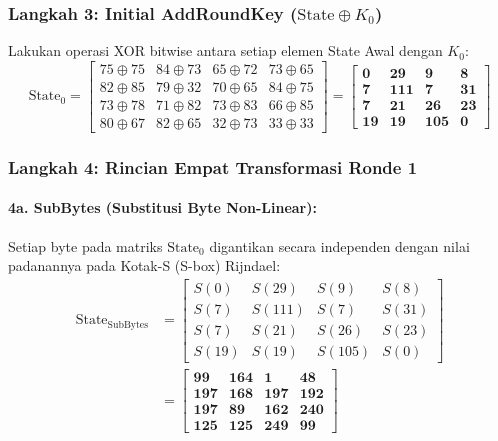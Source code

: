 \documentclass[11pt,a4paper]{article}
\begin{document}
\subsubsection*{Langkah 3: Initial AddRoundKey ($\text{State} \oplus K_0$)}
Lakukan operasi XOR bitwise antara setiap elemen State Awal dengan $K_0$:
\begin{equation*}
\text{State}_0 = \begin{bmatrix}
75 \oplus 75 & 84 \oplus 73 & 65 \oplus 72 & 73 \oplus 65 \\
82 \oplus 85 & 79 \oplus 32 & 70 \oplus 65 & 84 \oplus 75 \\
73 \oplus 78 & 71 \oplus 82 & 73 \oplus 83 & 66 \oplus 85 \\
80 \oplus 67 & 82 \oplus 65 & 32 \oplus 73 & 33 \oplus 33
\end{bmatrix}
= \mathbf{\begin{bmatrix}
0  & 29  & 9   & 8 \\
7  & 111 & 7   & 31 \\
7  & 21  & 26  & 23 \\
19 & 19  & 105 & 0
\end{bmatrix}}
\end{equation*}

\subsubsection*{Langkah 4: Rincian Empat Transformasi Ronde 1}

\paragraph{4a. SubBytes (Substitusi Byte Non-Linear):}
Setiap byte pada matriks $\text{State}_0$ digantikan secara independen dengan nilai padanannya pada Kotak-S (S-box) Rijndael:
\begin{align*}
\text{State}_{\text{SubBytes}} &= \begin{bmatrix}
S(0) & S(29) & S(9) & S(8) \\
S(7) & S(111) & S(7) & S(31) \\
S(7) & S(21) & S(26) & S(23) \\
S(19) & S(19) & S(105) & S(0)
\end{bmatrix} \\
&= \mathbf{\begin{bmatrix}
99  & 164 & 1   & 48 \\
197 & 168 & 197 & 192 \\
197 & 89  & 162 & 240 \\
125 & 125 & 249 & 99
\end{bmatrix}}
\end{align*}
\end{document}
